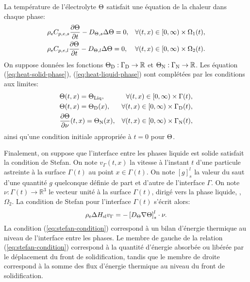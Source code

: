 La température de l'électrolyte $\Theta$ satisfait une équation
de la chaleur dans chaque phase:
\begin{align}
  &\rho_\mathrm{e}C_{p,e,s} \frac{\partial
    \Theta}{\partial t} - D_{\Theta,s} \Delta\Theta
  = 0, & \forall (t, x) \in [0,\infty)\times \Omega_1(t),\label{eq:heat-solid-phase}\\
    &\rho_\mathrm{e}C_{p,e,l} \frac{\partial
    \Theta}{\partial t} - D_{\Theta,l} \Delta\Theta
  = 0, & \forall (t, x) \in [0,\infty)\times \Omega_2(t).\label{eq:heat-liquid-phase}
\end{align}
On suppose données les fonctions
$\Theta_\mathrm{D}:\Gamma_\mathrm{D}\to\mathbb R$ et
$\Theta_\mathrm{N}:\Gamma_\mathrm{N}\to\mathbb R$. Les équation
(\ref{eq:heat-solid-phase}), (\ref{eq:heat-liquid-phase}) sont
complétées par les conditions aux limites:
\begin{align}
  &\temperature(t, x) = \tliq, %
  &\forall (t, x) \in [0,\infty)\times\Gamma(t),\label{eq:heat-transition}\\
  &\temperature(t, x) = \temperature_\mathrm{D}(x), %
  &\forall (t, x) \in [0,\infty)\times\Gamma_\mathrm{D}(t),\label{eq:heat-dirichlet}\\
  &\frac{\partial \temperature}{\partial \nu}(t, x) = \temperature_\mathrm{N}(x), %
  &\forall (t, x) \in [0,\infty)\times\Gamma_\mathrm{N}(t),\label{eq:heat-neumann}
\end{align}
ainsi qu'une condition initiale appropriée à $t = 0$ pour $\Theta$.

Finalement, on suppose que l'interface entre les phases liquide est
solide satisfait la condition de Stefan. On note $v_\Gamma(t, x)$ la
vitesse à l'instant $t$ d'une particule astreinte à la surface
$\Gamma(t)$ au point $x \in \Gamma(t)$. On note $[g]_s^l$ la valeur du
saut d'une quantité $g$ quelconque définie de part et d'autre de
l'interface $\Gamma$. On note $\nu: \Gamma(t)\to \mathbb R^3$ le vecteur
unité à la surface $\Gamma(t)$, dirigé vers la phase liquide, \ie,
$\Omega_2$. La condition de Stefan pour l'interface $\Gamma(t)$
s'écrit alors:
\begin{equation}
  \electrolytedensity \fusionenthalpy v_\Gamma = %
  - \left[\electrolytetdiff\nabla\temperature\right]_s^l\cdot \nu.%
  \label{eq:stefan-condition}
\end{equation}
La condition (\ref{eq:stefan-condition}) correspond à un bilan
d'énergie thermique au niveau de l'interface entre les phases.  Le
membre de gauche de la relation (\ref{eq:stefan-condition}) correspond
à la quantité d'énergie absorbée ou libérée par le déplacement du
front de solidification, tandis que le membre de droite correspond à
la somme des flux d'énergie thermique au niveau du front de
solidification.

